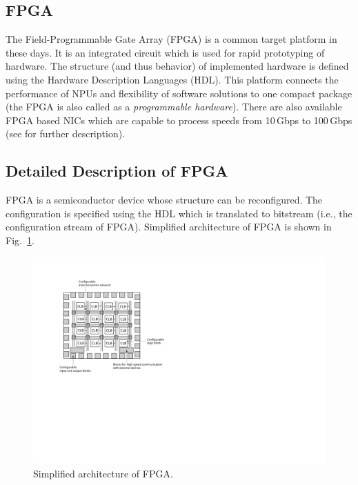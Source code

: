 \subsection*{FPGA}
The Field-Programmable Gate Array (FPGA) is a common target platform in these days. 
It is an integrated circuit which is used for rapid prototyping of hardware.
The structure (and thus behavior) of implemented hardware is defined using the Hardware Description Languages (HDL). 
This platform connects the performance of NPUs and flexibility of software solutions to one compact package 
(the FPGA is also called as a \textit{programmable hardware}). 
There are also available FPGA based NICs which are capable to process speeds from 10\,Gbps to 100\,Gbps 
(see \cite{combo-100g,netfpga} for further description).

\subsection{Detailed Description of FPGA}
\label{sec:fpgaTarget}
FPGA is a semiconductor device whose structure can be reconfigured.
The configuration is specified using the HDL which is translated to bitstream (i.e., the configuration stream of FPGA). 
Simplified architecture of FPGA is shown in Fig.~\ref{fig:fpgaArch}. 

\begin{figure}[ht]
    \centering
    \includegraphics[scale=0.75]{chapters/pic/fpga}
    \caption{Simplified architecture of FPGA.}
    \label{fig:fpgaArch}
\end{figure}

